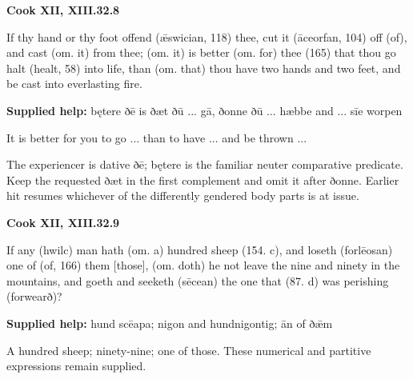 \par\begin{minipage}{\linewidth}\raggedright
\textbf{Cook XII, XIII.32.8}

If thy hand or thy foot offend (ǣswician, 118) thee, cut it (āceorfan, 104) off (of), and cast (om. it) from thee; (om. it) is better (om. for) thee (165) that thou go halt (healt, 58) into life, than (om. that) thou have two hands and two feet, and be cast into everlasting fire.

\textbf{Supplied help:} bętere ðē is ðæt ðū ... gā, ðonne ðū ... hæbbe and ... sīe worpen

It is better for you to go ... than to have ... and be thrown ...

The experiencer is dative ðē; bętere is the familiar neuter comparative predicate. Keep the requested ðæt in the first complement and omit it after ðonne. Earlier hit resumes whichever of the differently gendered body parts is at issue.

\end{minipage}\par\addvspace{4pt}

\par\begin{minipage}{\linewidth}\raggedright
\textbf{Cook XII, XIII.32.9}

If any (hwilc) man hath (om. a) hundred sheep (154. c), and loseth (forlēosan) one of (of, 166) them [those], (om. doth) he not leave the nine and ninety in the mountains, and goeth and seeketh (sēcean) the one that (87. d) was perishing (forwearð)?

\textbf{Supplied help:} hund scēapa; nigon and hundnigontig; ān of ðǣm

A hundred sheep; ninety-nine; one of those. These numerical and partitive expressions remain supplied.

\end{minipage}\par\addvspace{4pt}


